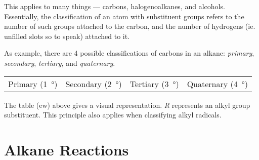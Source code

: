 		This applies to many things --- carbons, halogenoalkanes, and alcohols. Essentially, the classification of an atom with
		substituent groups refers to the number of such groups attached to the carbon, and the number of hydrogens (ie. unfilled
		slots so to speak) attached to it.

		As example, there are 4 possible classifications of carbons in an alkane: \textit{primary}, \textit{secondary}, \textit{tertiary},
		and \textit{quaternary}.

		\begin{center}\begin{table}[ht]\renewcommand{\arraystretch}{1.4}
		\begin{tabu} to \textwidth {| X[c,m] | X[c,m] | X[c,m] | X[c,m] |}

			\hline
			\vspace{2mm}								\vspace{2mm}	&
			\vspace{2mm}						\vspace{2mm}	&
			\vspace{2mm}				\vspace{2mm}	&
			\vspace{2mm}		\vspace{2mm}	\\

			\hline
			Primary (\SI{1}{\degree})		&
			Secondary (\SI{2}{\degree})		&
			Tertiary (\SI{3}{\degree})		&
			Quaternary (\SI{4}{\degree})	\\
			\hline

		\end{tabu}
		\end{table}\end{center}\vspace{-10mm}

		The table (ew) above gives a visual representation. \textit{R} represents an alkyl group substituent. This principle
		also applies when classifying alkyl radicals.



	\pagebreak
	\section{Alkane Reactions}
